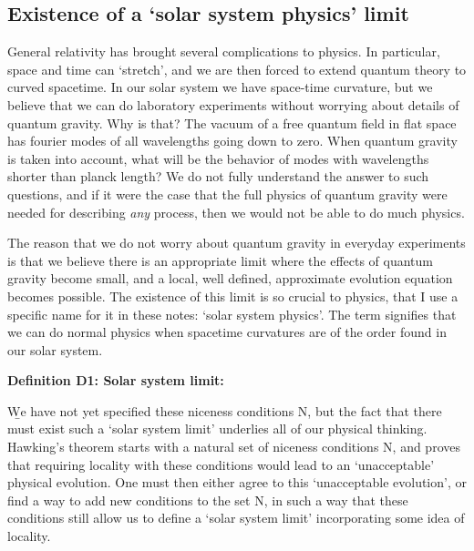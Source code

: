 \documentclass[12pt]{article}
\begin{document}
\subsection{Existence of a `solar system physics' limit}

General relativity has brought several complications to physics. In particular, space and time can `stretch', and we are then forced to extend quantum theory to curved spacetime. In our solar system we have space-time curvature, but we  believe that we can do laboratory experiments without worrying about details of quantum gravity.  Why is that? The vacuum of a free quantum field in flat space has fourier modes of all wavelengths going down to zero. When quantum gravity is taken into account, what will be the behavior of modes with wavelengths shorter than planck length? We do not fully understand the answer to such questions, and if it were the case that the full physics of quantum gravity were needed for describing {\it any} process, then we would not be able to do much physics. 

The reason that we do not worry about quantum gravity in everyday experiments is that we believe there is an appropriate limit where the effects of quantum gravity become small, and a local, well defined, approximate evolution equation becomes possible. The existence of this limit is so crucial to physics, that I use  a specific name for it in these notes:  `solar system physics'. The term  signifies that we can do normal physics when spacetime curvatures are of the order found in our solar system. 

\b

{\bf Definition D1: Solar system limit: } 

\b

We have not yet specified these niceness conditions N, but the fact that there must exist such a `solar system limit' underlies all of our physical thinking. Hawking's theorem starts with a natural set of niceness conditions N, and proves that  requiring locality with these conditions would lead to an `unacceptable' physical evolution. One must then either agree to this `unacceptable evolution', or find a way to add new conditions to the set N, in such a way that these conditions still allow us to define a  `solar system limit' incorporating some idea of locality.
\end{document}
